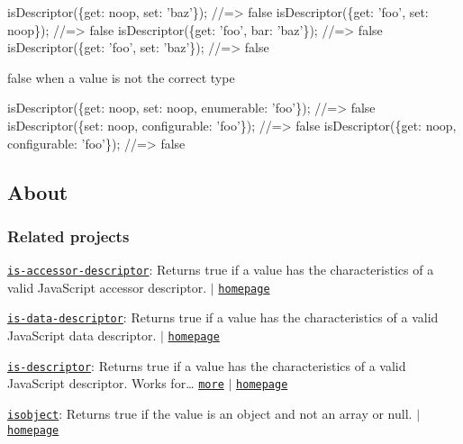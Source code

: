 \begin{DoxyCode}
isDescriptor(\{get: noop, set: 'baz'\});
//=> false
isDescriptor(\{get: 'foo', set: noop\});
//=> false
isDescriptor(\{get: 'foo', bar: 'baz'\});
//=> false
isDescriptor(\{get: 'foo', set: 'baz'\});
//=> false
\end{DoxyCode}


{\ttfamily false} when a value is not the correct type


\begin{DoxyCode}
isDescriptor(\{get: noop, set: noop, enumerable: 'foo'\});
//=> false
isDescriptor(\{set: noop, configurable: 'foo'\});
//=> false
isDescriptor(\{get: noop, configurable: 'foo'\});
//=> false
\end{DoxyCode}


\subsection*{About}

\subsubsection*{Related projects}


\begin{DoxyItemize}
\item \href{https://www.npmjs.com/package/is-accessor-descriptor}{\tt is-\/accessor-\/descriptor}\+: Returns true if a value has the characteristics of a valid Java\+Script accessor descriptor. $\vert$ \href{https://github.com/jonschlinkert/is-accessor-descriptor}{\tt homepage}
\item \href{https://www.npmjs.com/package/is-data-descriptor}{\tt is-\/data-\/descriptor}\+: Returns true if a value has the characteristics of a valid Java\+Script data descriptor. $\vert$ \href{https://github.com/jonschlinkert/is-data-descriptor}{\tt homepage}
\item \href{https://www.npmjs.com/package/is-descriptor}{\tt is-\/descriptor}\+: Returns true if a value has the characteristics of a valid Java\+Script descriptor. Works for… \href{https://github.com/jonschlinkert/is-descriptor}{\tt more} $\vert$ \href{https://github.com/jonschlinkert/is-descriptor}{\tt homepage}
\item \href{https://www.npmjs.com/package/isobject}{\tt isobject}\+: Returns true if the value is an object and not an array or null. $\vert$ \href{https://github.com/jonschlinkert/isobject}{\tt homepage}
\end{DoxyItemize}

